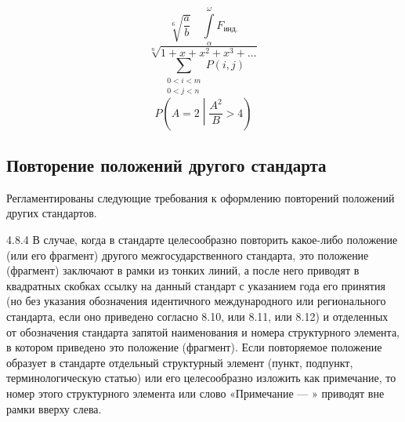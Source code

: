 \documentclass[12pt, twoside, final]{ruost}
\begin{document}
\begin{OST}
\begin{equation}
					\end{equation}
					\begin{equation}
					\sqrt[6]{\frac{a}{b}} \quad \int\limits_{\alpha}^{\omega} F_\text{инд.}
					\end{equation}
					\begin{equation}
					\sqrt[n]{1+x+x^2+x^3+\ldots}
					\end{equation}
					\begin{equation}
					\sum_{\substack{
							0<i<m \\
							0<j<n
						}}
						P(i,j)
					\end{equation}
					\begin{equation}
					P\left(A=2\middle|\frac{A^2}{B}>4\right)
					\end{equation}
					
					
			\subsection{Повторение положений другого стандарта}
			
				\point Регламентированы следующие требования к оформлению повторений положений других стандартов.
				
				\begin{stdquote}
					\par 4.8.4 В случае, когда в стандарте целесообразно повторить какое-либо положение (или его фрагмент) другого межгосударственного стандарта, это положение (фрагмент) заключают в рамки из тонких линий, а после него приводят в квадратных скобках ссылку на данный стандарт с указанием года его принятия (но без указания обозначения идентичного международного или регионального стандарта, если оно приведено согласно 8.10, или 8.11, или 8.12) и отделенных от обозначения стандарта запятой наименования и номера структурного элемента, в котором приведено это положение (фрагмент). Если повторяемое положение образует в стандарте отдельный структурный элемент (пункт, подпункт, терминологическую статью) или его целесообразно изложить как примечание, то номер этого структурного элемента или слово «Примечание --- » приводят вне рамки вверху слева.
					\par [ГОСТ 1.5---2001]
				\end{stdquote}
				
				

\end{OST}
\end{document}
